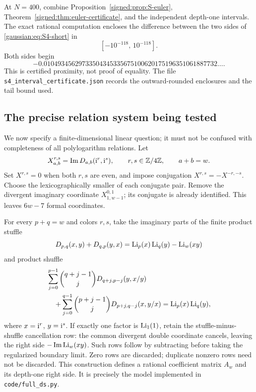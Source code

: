 At $N=400$, combine Proposition~\ref{signed:prop:S-euler}, Theorem~\ref{signed:thm:euler-certificate}, and the independent depth-one intervals. The exact rational computation encloses the difference between the two sides of \eqref{gaussian:eq:S4-short} in
\begin{equation}\label{signed:eq:S4-difference}
 [-10^{-118},\,10^{-118}].
\end{equation}
Both sides begin
\[
 -0.01049345629733504345335675100620175196351061887732\ldots.
\]
This is certified proximity, not proof of equality. The file
\texttt{s4\_interval\_certificate.json} records the outward-rounded enclosures and the tail bound used.

\subsection{The precise relation system being tested}
We now specify a finite-dimensional linear question; it must not be confused with completeness of all polylogarithm relations. Let
\[
 X_{a,b}^{r,s}=\operatorname{Im} D_{a,b}(\mathrm{i}^r,\mathrm{i}^s),\qquad r,s\in\mathbb Z/4\mathbb Z,
 \qquad a+b=w.
\]
Set $X^{r,s}=0$ when both $r,s$ are even, and impose conjugation
$X^{r,s}=-X^{-r,-s}$. Choose the lexicographically smaller of each conjugate pair. Remove the divergent imaginary coordinate $X_{1,w-1}^{0,1}$; its conjugate is already identified. This leaves $6w-7$ formal coordinates.

For every $p+q=w$ and colors $r,s$, take the imaginary parts of the finite product stuffle
\begin{equation}\label{signed:eq:full-stuffle}
 D_{p,q}(x,y)+D_{q,p}(y,x)=\operatorname{Li}_p(x)\operatorname{Li}_q(y)-\operatorname{Li}_w(xy)
\end{equation}
and product shuffle
\begin{align}\label{signed:eq:full-shuffle}
 &\sum_{j=0}^{p-1}\binom{q+j-1}{j}D_{q+j,p-j}(y,x/y)\notag\\
 &\quad+\sum_{j=0}^{q-1}\binom{p+j-1}{j}D_{p+j,q-j}(x,y/x)
 =\operatorname{Li}_p(x)\operatorname{Li}_q(y),
\end{align}
where $x=\mathrm{i}^r$, $y=\mathrm{i}^s$. If exactly one factor is $\operatorname{Li}_1(1)$, retain the stuffle-minus-shuffle cancellation row: the common divergent double coordinate cancels, leaving the right side $-\operatorname{Im}\operatorname{Li}_w(xy)$. Such rows follow by subtracting before taking the regularized boundary limit. Zero rows are discarded; duplicate nonzero rows need not be discarded. This construction defines a rational coefficient matrix $A_w$ and its depth-one right side. It is precisely the model implemented in \texttt{code/full\_ds.py}.

